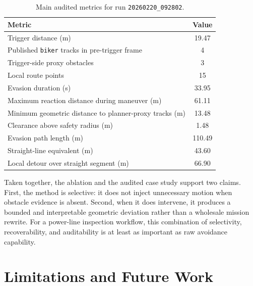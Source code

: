 \documentclass[a4paper,11pt]{article}
\begin{document}
\begin{table}[t]
    \centering
    \caption{Main audited metrics for run \texttt{20260220\_092802}.}
    \label{tab:case}
    \small
    \begin{tabularx}{\linewidth}{@{}Y S[table-format=3.2]@{}}
        \toprule
        \textbf{Metric} & {\textbf{Value}} \\
        \midrule
        Trigger distance (m) & 19.47 \\
        Published \texttt{biker} tracks in pre-trigger frame & 4 \\
        Trigger-side proxy obstacles & 3 \\
        Local route points & 15 \\
        Evasion duration (s) & 33.95 \\
        Maximum reaction distance during maneuver (m) & 61.11 \\
        Minimum geometric distance to planner-proxy tracks (m) & 13.48 \\
        Clearance above safety radius (m) & 1.48 \\
        Evasion path length (m) & 110.49 \\
        Straight-line equivalent (m) & 43.60 \\
        Local detour over straight segment (m) & 66.90 \\
        \bottomrule
    \end{tabularx}
\end{table}

Taken together, the ablation and the audited case study support two claims. First, the method is selective: it does not inject unnecessary motion when obstacle evidence is absent. Second, when it does intervene, it produces a bounded and interpretable geometric deviation rather than a wholesale mission rewrite. For a power-line inspection workflow, this combination of selectivity, recoverability, and auditability is at least as important as raw avoidance capability.

\section{Limitations and Future Work}
\end{document}
